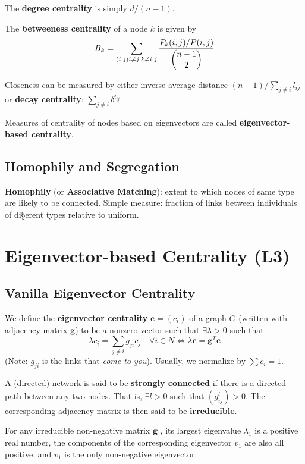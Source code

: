 \documentclass[9pt]{article}
\begin{document}
\begin{multicols}{2}
The \textbf{degree centrality} is simply $d/(n-1)$.

The \textbf{betweeness centrality} of a node $k$ is given by
\begin{equation}
B_k = \sum_{(i,j) i \ne j, k \ne i,j} \frac{P_{k}(i,j)/P(i,j)}{\dbinom{n-1}{2}}
\end{equation}

Closeness can be measured by either inverse average distance $(n-1)/\sum_{j \ne i}l_{ij}$ or \textbf{decay centrality}: $\sum_{j \ne i} \delta^{l_{ij}}$

Measures of centrality of nodes based on eigenvectors are called
\textbf{eigenvector-based centrality}.

\subsection{Homophily and Segregation}

\textbf{Homophily} (or \textbf{Associative Matching}): extent to 
which nodes of same type are likely to be connected. Simple measure:
fraction of links between individuals of di§erent types relative to
uniform.

\section{Eigenvector-based Centrality (L3)}

\subsection{Vanilla Eigenvector Centrality}
We define the \textbf{eigenvector centrality} $\mathbf{c}=(c_i)$ of a graph $G$ (written with adjacency matrix $\mathbf{g}$) to be a nonzero vector 
such that $\exists \lambda > 0$ such that
\begin{equation}
\lambda c_i = \sum_{j \ne i}g_{ji}c_j \quad \forall{i} \in N 
\Leftrightarrow \lambda\mathbf{c}=\mathbf{g}^{T}\mathbf{c}
\end{equation}
(Note: $g_{ji}$ is the links that \textit{come to you}). Usually,
we normalize by $\sum{c_i}=1$.

A (directed) network is said to be \textbf{strongly connected} if there is a directed path between any two nodes. That is, $\exists l > 0$ such that $(g^{l}_{ij}) > 0$. The corresponding adjacency matrix is then said to be \textbf{irreducible}. 

\begin{theorem}
    For any irreducible non-negative matrix $\mathbf{g}$ , its largest 
    eigenvalue $\lambda_1$ is a positive real number, the components of the 
    corresponding eigenvector $v_1$ are also all positive, and $v_1$ is the 
    only non-negative eigenvector.
\end{theorem}


\end{multicols}
\end{document}
